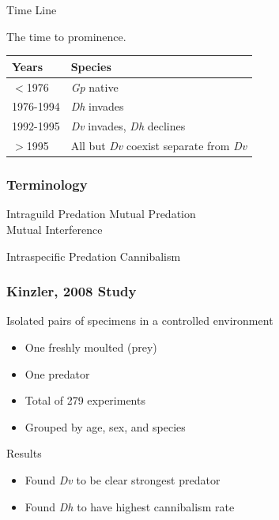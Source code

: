 \begin{frame}{Time Line}

  \vfill

  The time to prominence. 

  \vfill

  \begin{tabular}{l|l}
    Years      & Species \\ \hline
    $<$1976    & \textit{Gp} native\\
    1976-1994  & \textit{Dh} invades\\
    1992-1995  & \textit{Dv} invades, \textit{Dh} declines\\
    $>$1995    & All but \textit{Dv} coexist separate from \textit{Dv}
  \end{tabular}

  \vfill

\end{frame}

\begin{frame}
   \frametitle{Terminology}
	\begin{block}{Intraguild Predation}
		Mutual Predation\\
		Mutual Interference \\
	\end{block}
	\begin{block}{Intraspecific Predation}
		Cannibalism
	\end{block}
\end{frame}

\begin{frame}
   \frametitle{Kinzler, 2008 Study}
	\vfill
	
	Isolated pairs of specimens in a controlled environment
	\begin{itemize}
		\item One freshly moulted (prey) 
		\item One predator
		\item Total of 279 experiments
		\item Grouped by age, sex, and species
	\end{itemize}
	
\vfill
	Results\\
	\begin{itemize}
	\item Found \textit{Dv} to be clear strongest predator\\
\vspace{.5em}
	\item Found \textit{Dh} to have highest cannibalism rate
\end{itemize}

\vfill
\end{frame}

